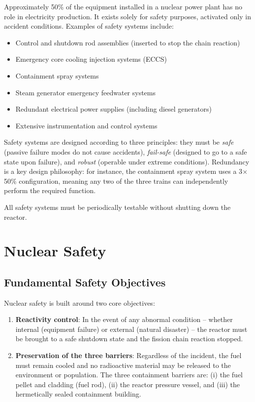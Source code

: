 Approximately 50\% of the equipment installed in a nuclear power plant has no role in electricity production. It exists solely for safety purposes, activated only in accident conditions. Examples of safety systems include:

\begin{itemize}[noitemsep]
    \item Control and shutdown rod assemblies (inserted to stop the chain reaction)
    \item Emergency core cooling injection systems (ECCS)
    \item Containment spray systems
    \item Steam generator emergency feedwater systems
    \item Redundant electrical power supplies (including diesel generators)
    \item Extensive instrumentation and control systems
\end{itemize}

Safety systems are designed according to three principles: they must be \textit{safe} (passive failure modes do not cause accidents), \textit{fail-safe} (designed to go to a safe state upon failure), and \textit{robust} (operable under extreme conditions). Redundancy is a key design philosophy: for instance, the containment spray system uses a 3$\times$50\% configuration, meaning any two of the three trains can independently perform the required function.

All safety systems must be periodically testable without shutting down the reactor.

\section{Nuclear Safety}

\subsection{Fundamental Safety Objectives}

Nuclear safety is built around two core objectives:

\begin{enumerate}[noitemsep]
    \item \textbf{Reactivity control}: In the event of any abnormal condition -- whether internal (equipment failure) or external (natural disaster) -- the reactor must be brought to a safe shutdown state and the fission chain reaction stopped.
    \item \textbf{Preservation of the three barriers}: Regardless of the incident, the fuel must remain cooled and no radioactive material may be released to the environment or population. The three containment barriers are: (i) the fuel pellet and cladding (fuel rod), (ii) the reactor pressure vessel, and (iii) the hermetically sealed containment building.
\end{enumerate}

